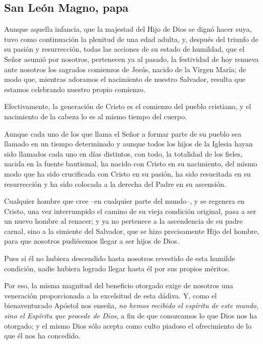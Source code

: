 		\subsection{San León Magno, papa}
		
			
			
			\begin{body}
				Aunque aquella infancia, que la majestad del Hijo de Dios se dignó hacer suya, tuvo como continuación la plenitud de una edad adulta, y, después del triunfo de su pasión y resurrección, todas las acciones de su estado de humildad, que el Señor asumió por nosotros, pertenecen ya al pasado, la festividad de hoy renueva ante nosotros los sagrados comienzos de Jesús, nacido de la Virgen María; de modo que, mientras adoramos el nacimiento de nuestro Salvador, resulta que estamos celebrando nuestro propio comienzo.
				
				Efectivamente, la generación de Cristo es el comienzo del pueblo cristiano, y el nacimiento de la cabeza lo es al mismo tiempo del cuerpo.
				
				Aunque cada uno de los que llama el Señor a formar parte de su pueblo sea llamado en un tiempo determinado y aunque todos los hijos de la Iglesia hayan sido llamados cada uno en días distintos, con todo, la totalidad de los fieles, nacida en la fuente bautismal, ha nacido con Cristo en su nacimiento, del mismo modo que ha sido crucificada con Cristo en su pasión, ha sido resucitada en su resurrección y ha sido colocada a la derecha del Padre en su ascensión.
				
				Cualquier hombre que cree --en cualquier parte del mundo--, y se regenera en Cristo, una vez interrumpido el camino de su vieja condición original, pasa a ser un nuevo hombre al renacer; y ya no pertenece a la ascendencia de su padre carnal, sino a la simiente del Salvador, que se hizo precisamente Hijo del hombre, para que nosotros pudiésemos llegar a ser hijos de Dios.
				
				Pues si él no hubiera descendido hasta nosotros revestido de esta humilde condición, nadie hubiera logrado llegar hasta él por sus propios méritos.
				
				Por eso, la misma magnitud del beneficio otorgado exige de nosotros una veneración proporcionada a la excelsitud de esta dádiva. Y, como el bienaventurado Apóstol nos enseña, \emph{no hemos recibido el espíritu de este mundo, sino el Espíritu que procede de Dios}, a fin de que conozcamos lo que Dios nos ha otorgado; y el mismo Dios sólo acepta como culto piadoso el ofrecimiento de lo que él nos ha concedido.
				

\end{body}
